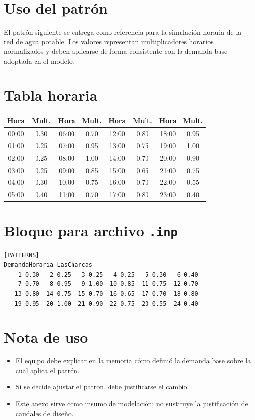\documentclass[11pt]{article}
\begin{document}

\section{Uso del patr\'on}
El patr\'on siguiente se entrega como referencia para la simulaci\'on horaria de la red de agua potable. Los valores representan multiplicadores horarios normalizados y deben aplicarse de forma consistente con la demanda base adoptada en el modelo.

\section{Tabla horaria}
\begin{center}
\begin{tabular}{cccccccc}
\toprule
Hora & Mult. & Hora & Mult. & Hora & Mult. & Hora & Mult. \\
\midrule
00:00 & 0.30 & 06:00 & 0.70 & 12:00 & 0.80 & 18:00 & 0.95 \\
01:00 & 0.25 & 07:00 & 0.95 & 13:00 & 0.75 & 19:00 & 1.00 \\
02:00 & 0.25 & 08:00 & 1.00 & 14:00 & 0.70 & 20:00 & 0.90 \\
03:00 & 0.25 & 09:00 & 0.85 & 15:00 & 0.65 & 21:00 & 0.75 \\
04:00 & 0.30 & 10:00 & 0.75 & 16:00 & 0.70 & 22:00 & 0.55 \\
05:00 & 0.40 & 11:00 & 0.70 & 17:00 & 0.80 & 23:00 & 0.40 \\
\bottomrule
\end{tabular}
\end{center}

\section{Bloque para archivo \texttt{.inp}}
\begin{verbatim}
[PATTERNS]
DemandaHoraria_LasCharcas
    1 0.30   2 0.25   3 0.25   4 0.25   5 0.30   6 0.40
    7 0.70   8 0.95   9 1.00  10 0.85  11 0.75  12 0.70
   13 0.80  14 0.75  15 0.70  16 0.65  17 0.70  18 0.80
   19 0.95  20 1.00  21 0.90  22 0.75  23 0.55  24 0.40
\end{verbatim}

\section{Nota de uso}
\begin{itemize}
\item El equipo debe explicar en la memoria c\'omo defini\'o la demanda base sobre la cual aplica el patr\'on.
\item Si se decide ajustar el patr\'on, debe justificarse el cambio.
\item Este anexo sirve como insumo de modelaci\'on; no sustituye la justificaci\'on de caudales de dise\~no.
\end{itemize}
\end{document}
